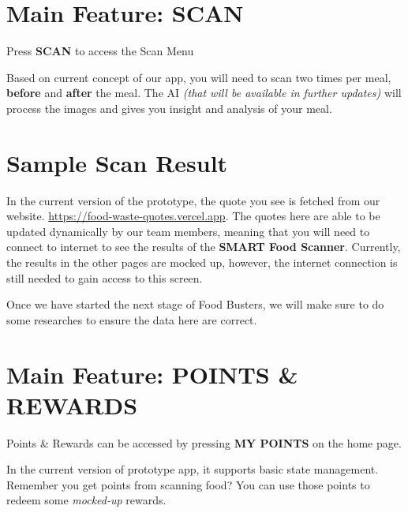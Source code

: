 \documentclass[a4paper,12pt]{article}
\begin{document}
\pagebreak
\section{Main Feature: SCAN}

Press \textbf{SCAN} to access the Scan Menu


Based on current concept of our app, you will need to scan two times per meal,
\textbf{before} and \textbf{after} the meal.
The AI \textit{(that will be available in further updates)} will process
the images and gives you insight and analysis of your meal.

\pagebreak
\section*{Sample Scan Result}


In the current version of the prototype, the quote you see is fetched from our website.
\href{https://food-waste-quotes.vercel.app}{https://food-waste-quotes.vercel.app}.
The quotes here are able to be updated dynamically by our team members,
meaning that you will need to connect to internet to see the results of
the \textbf{SMART Food Scanner}. Currently, the results in the other pages are mocked up,
however, the internet connection is still needed to gain access to this screen.

Once we have started the next stage of Food Busters, we will make sure to do
some researches to ensure the data here are correct.

\pagebreak
\section{Main Feature: POINTS \& REWARDS}

Points \& Rewards can be accessed by pressing \textbf{MY POINTS} on the home page.


In the current version of prototype app, it supports basic state management.
Remember you get points from scanning food? You can use those points to redeem
some \textit{mocked-up} rewards.
\end{document}
